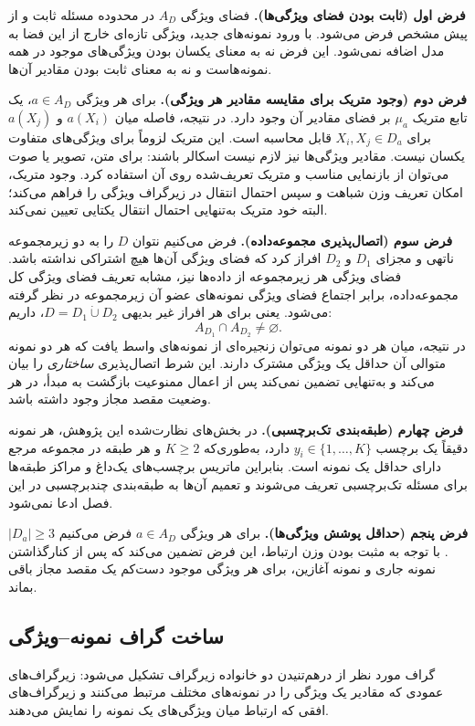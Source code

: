 \medskip
\noindent\textbf{فرض اول (ثابت بودن فضای ویژگی‌ها).}
فضای ویژگی $A_D$ در محدوده مسئله ثابت و از پیش مشخص فرض می‌شود. با ورود نمونه‌های جدید، ویژگی تازه‌ای خارج از این فضا به مدل اضافه نمی‌شود. این فرض نه به معنای یکسان بودن ویژگی‌های موجود در همه نمونه‌هاست و نه به معنای ثابت بودن مقادیر آن‌ها.

\medskip
\noindent\textbf{فرض دوم (وجود متریک برای مقایسه مقادیر هر ویژگی).}
برای هر ویژگی $a\in A_D$، یک تابع متریک $\mu_a$ بر فضای مقادیر آن وجود دارد. در نتیجه، فاصله میان $a(X_i)$ و $a(X_j)$ برای $X_i,X_j\in D_a$ قابل محاسبه است. این متریک لزوماً برای ویژگی‌های متفاوت یکسان نیست. مقادیر ویژگی‌ها نیز لازم نیست اسکالر باشند: برای متن، تصویر یا صوت می‌توان از بازنمایی مناسب و متریک تعریف‌شده روی آن استفاده کرد. وجود متریک، امکان تعریف وزن شباهت و سپس احتمال انتقال در زیرگراف ویژگی را فراهم می‌کند؛ البته خود متریک به‌تنهایی احتمال انتقال یکتایی تعیین نمی‌کند.

\medskip
\noindent\textbf{فرض سوم (اتصال‌پذیری مجموعه‌داده).}
فرض می‌کنیم نتوان $D$ را به دو زیرمجموعه ناتهی و مجزای $D_1$ و $D_2$ افراز کرد که فضای ویژگی آن‌ها هیچ اشتراکی نداشته باشد. فضای ویژگی هر زیرمجموعه از داده‌ها نیز، مشابه تعریف فضای ویژگی کل مجموعه‌داده، برابر اجتماع فضای ویژگی نمونه‌های عضو آن زیرمجموعه در نظر گرفته می‌شود. یعنی برای هر افراز غیر بدیهی $D=D_1\mathbin{\dot\cup}D_2$، داریم:
\begin{equation}\label{cmp:eq:ch3-connectivity}
A_{D_1}\cap A_{D_2}\neq\varnothing.
\end{equation}
در نتیجه، میان هر دو نمونه می‌توان زنجیره‌ای از نمونه‌های واسط یافت که هر دو نمونه متوالی آن حداقل یک ویژگی مشترک دارند. این شرط اتصال‌پذیری \emph{ساختاری} را بیان می‌کند و به‌تنهایی تضمین نمی‌کند پس از اعمال ممنوعیت بازگشت به مبدأ، در هر وضعیت مقصد مجاز وجود داشته باشد.

\medskip
\noindent\textbf{فرض چهارم (طبقه‌بندی تک‌برچسبی).}
در بخش‌های نظارت‌شده این پژوهش، هر نمونه دقیقاً یک برچسب $y_i\in\{1,\ldots,K\}$ دارد، به‌طوری‌که $K\ge2$ و هر طبقه در مجموعه مرجع دارای حداقل یک نمونه است. بنابراین ماتریس برچسب‌های یک‌داغ و مراکز طبقه‌ها برای مسئله تک‌برچسبی تعریف می‌شوند و تعمیم آن‌ها به طبقه‌بندی چندبرچسبی در این فصل ادعا نمی‌شود.

\medskip
\noindent\textbf{فرض پنجم (حداقل پوشش ویژگی‌ها).}
برای هر ویژگی $a\in A_D$ فرض می‌کنیم $|D_a|\ge3$. با توجه به مثبت بودن وزن ارتباط، این فرض تضمین می‌کند که پس از کنارگذاشتن نمونه جاری و نمونه آغازین، برای هر ویژگی موجود دست‌کم یک مقصد مجاز باقی بماند.

\subsection{ساخت گراف نمونه--ویژگی}
\label{cmp:subsec:ch3-graph}
گراف مورد نظر از درهم‌تنیدن دو خانواده زیرگراف تشکیل می‌شود: زیرگراف‌های عمودی که مقادیر یک ویژگی را در نمونه‌های مختلف مرتبط می‌کنند و زیرگراف‌های افقی که ارتباط میان ویژگی‌های یک نمونه را نمایش می‌دهند.


